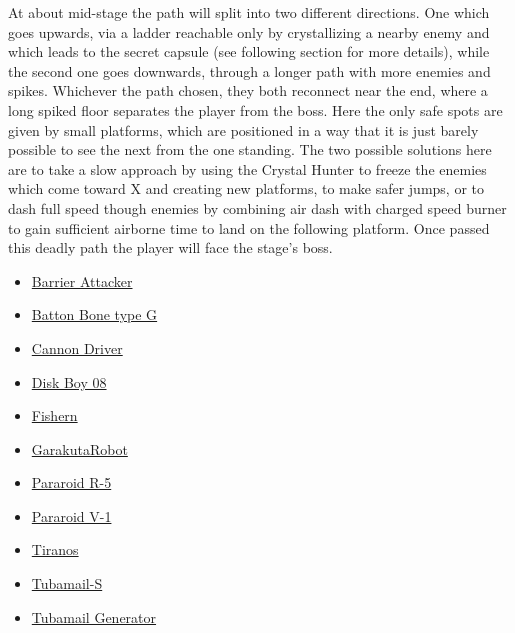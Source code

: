At about mid-stage the path will split into two different directions. One which goes upwards, via a ladder reachable only by crystallizing a nearby enemy and which leads to the secret capsule (see following section for more details), while the second one goes downwards, through a longer path with more enemies and spikes. Whichever the path chosen, they both reconnect near the end, where a long spiked floor separates the player from the boss. Here the only safe spots are given by small platforms, which are positioned in a way that it is just barely possible to see the next from the one standing. The two possible solutions here are to take a slow approach by using the Crystal Hunter to freeze the enemies which come toward X and creating new platforms, to make safer jumps, or to dash full speed though enemies by combining air dash with charged speed burner to gain sufficient airborne time to land on the following platform. Once passed this deadly path the player will face the stage's boss.
\begin{itemize}
	\item \hyperlink{enem:Barrier_Attacker}{Barrier Attacker}
	\item \hyperlink{enem:Batton_Bone_type_G}{Batton Bone type G}
	\item \hyperlink{enem:Cannon_Driver}{Cannon Driver}
	\item \hyperlink{enem:Disk_Boy_08}{Disk Boy 08}
	\item \hyperlink{enem:Fishern}{Fishern}
	\item \hyperlink{enem:Garakuta_Robot}{GarakutaRobot}
	\item \hyperlink{enem:Pararoid_R-5}{Pararoid R-5}
	\item \hyperlink{enem:Pararoid_V-1}{Pararoid V-1}
	\item \hyperlink{enem:Tiranos}{Tiranos}
	\item \hyperlink{enem:Tubamail-S}{Tubamail-S}
	\item \hyperlink{enem:Tubamail_Generator}{Tubamail Generator}
\end{itemize}


